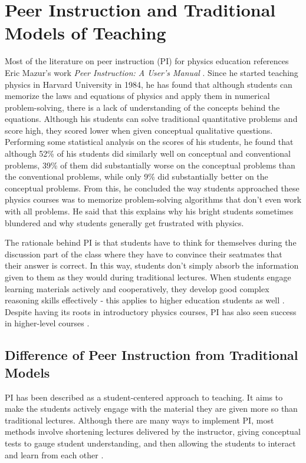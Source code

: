\chapter{Peer Instruction and Traditional Models of Teaching}

Most of the literature on peer instruction (PI) for physics education references Eric Mazur's work \textit{Peer Instruction: A User's Manual} \cite{mazur1997peer,mazur1999}.
Since he started teaching physics in Harvard University in 1984, he has found that although students can memorize the laws and equations of physics and apply them in numerical problem-solving, there is a lack of understanding of the concepts behind the equations.
Although his students can solve traditional quantitative problems and score high, they scored lower when given conceptual qualitative questions.
Performing some statistical analysis on the scores of his students, he found that although 52\% of his students did similarly well on conceptual and conventional problems, 39\% of them did substantially worse on the conceptual problems than the conventional problems, while only 9\% did substantially better on the conceptual problems.
From this, he concluded the way students approached these physics courses was to memorize problem-solving algorithms that don't even work with all problems.
He said that this explains why his bright students sometimes blundered and why students generally get frustrated with physics.

The rationale behind PI is that students have to think for themselves during the discussion part of the class where they have to convince their seatmates that their answer is correct.
In this way, students don't simply absorb the information given to them as they would during traditional lectures.
When students engage learning materials actively and cooperatively, they develop good complex reasoning skills effectively - this applies to higher education students as well \cite{johnson2008active}.
Despite having its roots in introductory physics courses, PI has also seen success in higher-level courses \cite{fagen2000factors, fagen2002peer}.


\section{Difference of Peer Instruction from Traditional Models}\label{sec:PI vs TI}
PI has been described as a student-centered approach to teaching. 
It aims to make the students actively engage with the material they are given more so than traditional lectures.
Although there are many ways to implement PI, most methods involve shortening lectures delivered by the instructor, giving conceptual tests to gauge student understanding, and then allowing the students to interact and learn from each other \cite{crouch2001peer,mazur1999}.

